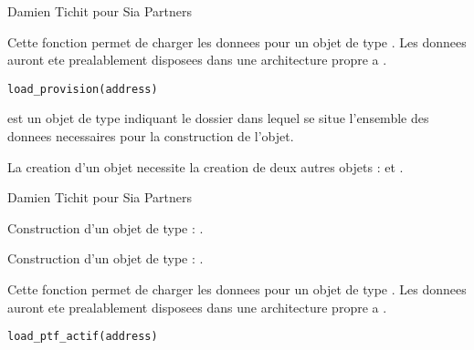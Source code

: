 \documentclass[a4paper]{book}
\begin{document}
%
\begin{Author}\relax
Damien Tichit pour Sia Partners
\end{Author}
%
\begin{Description}\relax
Cette fonction permet de charger les donnees pour un objet de type .
Les donnees auront ete prealablement disposees dans une architecture propre a .
\end{Description}
%
\begin{Usage}
\begin{verbatim}
load_provision(address)
\end{verbatim}
\end{Usage}
%
\begin{Arguments}
\begin{ldescription}
\item[\code{address}] est un objet de type  indiquant le dossier dans lequel se situe l'ensemble des donnees necessaires
pour la construction de l'objet.
\end{ldescription}
\end{Arguments}
%
\begin{Details}\relax
La creation d'un objet  necessite la creation de deux autres objets :  et .
\end{Details}
%
\begin{Author}\relax
Damien Tichit pour Sia Partners
\end{Author}
%
\begin{SeeAlso}\relax
Construction d'un objet de type  : .

Construction d'un objet de type  : .
\end{SeeAlso}
%
\begin{Description}\relax
Cette fonction permet de charger les donnees pour un objet de type . Les donnees auront ete prealablement disposees dans
une architecture propre a .
\end{Description}
%
\begin{Usage}
\begin{verbatim}
load_ptf_actif(address)
\end{verbatim}
\end{Usage}
\end{document}
